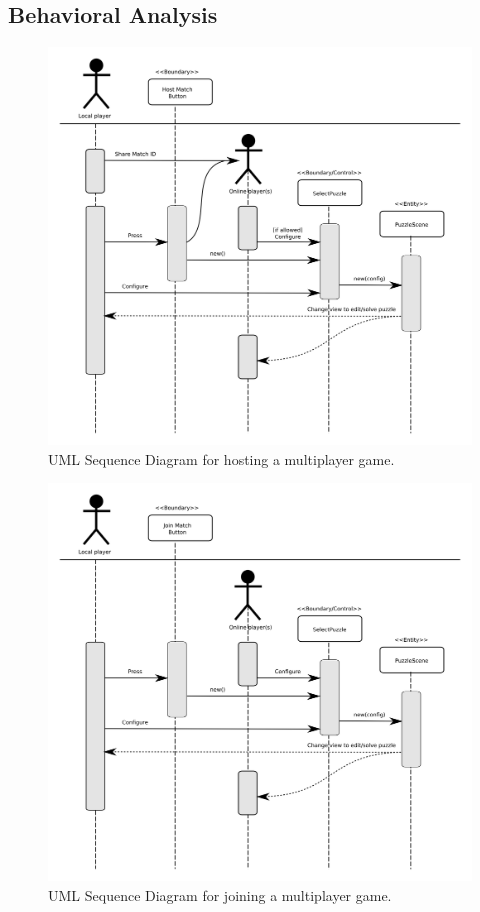 \documentclass[12pt]{article}
\begin{document}
\subsection{Behavioral Analysis}\label{behavioral-analysis-HR}


    \begin{figure}[H]
        \centering
        \includegraphics[width=6in]{sequence_host_match.png}
        \caption{UML Sequence Diagram for hosting a multiplayer game.}
    \end{figure}


    \begin{figure}[H]
        \centering
        \includegraphics[width=6in]{sequence_join_match.png}
        \caption{UML Sequence Diagram for joining a multiplayer game.}
    \end{figure}
\end{document}

